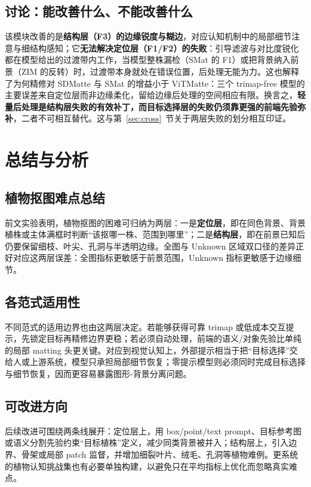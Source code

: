 \documentclass[supercite]{HustGraduPaper}
\begin{document}
	\subsection{讨论：能改善什么、不能改善什么}
	该模块改善的是\textbf{结构层（F3）的边缘锐度与糊边}，对应认知机制中的局部细节注意与细结构感知；它\textbf{无法解决定位层（F1/F2）的失败}：引导滤波与对比度锐化都在模型给出的过渡带内工作，当模型整株漏检（SMat 的 F1）或把背景纳入前景（ZIM 的反转）时，过渡带本身就处在错误位置，后处理无能为力。这也解释了为何精修对 SDMatte 与 SMat 的增益小于 ViTMatte：三个 trimap-free 模型的主要误差来自定位层而非边缘柔化，留给边缘后处理的空间相应有限。换言之，\textbf{轻量后处理是结构层失败的有效补丁，而目标选择层的失败仍须靠更强的前端先验弥补}，二者不可相互替代。这与第~\ref{sec:cross}~节关于两层失败的划分相互印证。

	\section{总结与分析}
	\subsection{植物抠图难点总结}
	前文实验表明，植物抠图的困难可归纳为两层：一是\textbf{定位层}，即在同色背景、背景植株或主体满框时判断“该抠哪一株、范围到哪里”；二是\textbf{结构层}，即在前景已知后仍要保留细枝、叶尖、孔洞与半透明边缘。全图与 Unknown 区域双口径的差异正好对应这两层误差：全图指标更敏感于前景范围，Unknown 指标更敏感于边缘细节。

	\subsection{各范式适用性}
	不同范式的适用边界也由这两层决定。若能够获得可靠 trimap 或低成本交互提示，先锁定目标再精修边界更稳；若必须自动处理，前端的语义/对象先验比单纯的局部 matting 头更关键。对应到视觉认知上，外部提示相当于把“目标选择”交给人或上游系统，模型只承担局部细节恢复；零提示模型则必须同时完成目标选择与细节恢复，因而更容易暴露图形-背景分离问题。

	\subsection{可改进方向}
	后续改进可围绕两条线展开：定位层上，用 box/point/text prompt、目标参考图或语义分割先验约束“目标植株”定义，减少同类背景被并入；结构层上，引入边界、骨架或局部 patch 监督，并增加细裂叶片、绒毛、孔洞等植物难例。更系统的植物认知挑战集也有必要单独构建，以避免只在平均指标上优化而忽略真实难点。
\end{document}
